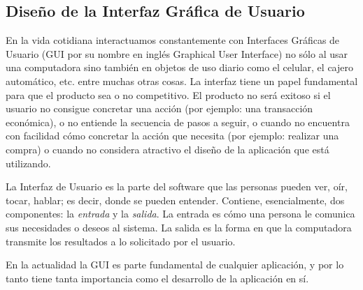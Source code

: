 \documentclass[11pt,oneside]{book}
\begin{document}
\newpage
\subsection{Diseño de la Interfaz Gráfica de Usuario}
En la vida cotidiana interactuamos constantemente con Interfaces Gráficas de Usuario (GUI por su nombre en inglés Graphical User Interface) no sólo al usar una computadora sino también en objetos de uso diario como el celular, el cajero automático, etc. entre muchas otras cosas. La interfaz tiene un papel fundamental para que el producto sea o no competitivo. El producto no será exitoso si el usuario no consigue concretar una acción (por ejemplo:  una transacción económica), o no entiende la secuencia de pasos a seguir, o cuando no encuentra con facilidad cómo concretar la acción que necesita (por ejemplo: realizar una compra) o cuando no considera atractivo el diseño de la aplicación que está utilizando.

La Interfaz de Usuario es la parte del software que las personas pueden ver, oír, tocar, hablar; es decir, donde   se pueden entender. Contiene, esencialmente, dos componentes: la \textit{entrada} y la \textit{salida}. La entrada es cómo una persona le comunica sus necesidades o deseos al sistema. La salida es la forma en que la computadora transmite los resultados a lo solicitado por el usuario.

En la actualidad la GUI es parte fundamental de cualquier aplicación, y por lo tanto tiene tanta importancia como el desarrollo de la aplicación en sí.
\end{document}
